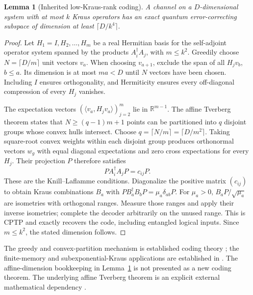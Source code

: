 \documentclass[11pt]{article}
\newtheorem{lemma}[theorem]{Lemma}
\theoremstyle{definition}\newtheorem{definition}[theorem]{Definition}
\begin{document}
\begin{lemma}[Inherited low-Kraus-rank coding]\label{lem:code}
A channel on a $D$-dimensional system with at most $k$ Kraus operators has an exact quantum error-correcting subspace of dimension at least $\lceil D/k^4\rceil$.
\end{lemma}
\begin{proof}
Let $H_1=I,H_2,\ldots,H_m$ be a real Hermitian basis for the self-adjoint operator system spanned by the products $A_i^\dagger A_j$, with $m\le k^2$. Greedily choose $N=\lceil D/m\rceil$ unit vectors $v_a$. When choosing $v_{a+1}$, exclude the span of all $H_jv_b$, $b\le a$. Its dimension is at most $ma<D$ until $N$ vectors have been chosen. Including $I$ ensures orthogonality, and Hermiticity ensures every off-diagonal compression of every $H_j$ vanishes.

The expectation vectors $(\langle v_a,H_jv_a\rangle)_{j=2}^m$ lie in $\mathbb R^{m-1}$. The affine Tverberg theorem states that $N\ge(q-1)m+1$ points can be partitioned into $q$ disjoint groups whose convex hulls intersect. Choose $q=\lceil N/m\rceil=\lceil D/m^2\rceil$. Taking square-root convex weights within each disjoint group produces orthonormal vectors $w_g$ with equal diagonal expectations and zero cross expectations for every $H_j$. Their projection $P$ therefore satisfies
\[
 PA_i^\dagger A_jP=c_{ij}P.
\]
These are the Knill--Laflamme conditions. Diagonalize the positive matrix $(c_{ij})$ to obtain Kraus combinations $B_a$ with $PB_a^\dagger B_bP=\mu_a\delta_{ab}P$. For $\mu_a>0$, $B_aP/\sqrt{\mu_a}$ are isometries with orthogonal ranges. Measure those ranges and apply their inverse isometries; complete the decoder arbitrarily on the unused range. This is CPTP and exactly recovers the code, including entangled logical inputs. Since $m\le k^2$, the stated dimension follows.
\end{proof}

The greedy and convex-partition mechanism is established coding theory \cite{KLV}; the finite-memory and subexponential-Kraus applications are established in \cite{KW,GBM}. The affine-dimension bookkeeping in Lemma~\ref{lem:code} is not presented as a new coding theorem. The underlying affine Tverberg theorem is an explicit external mathematical dependency \cite{Tverberg}.
\end{document}
